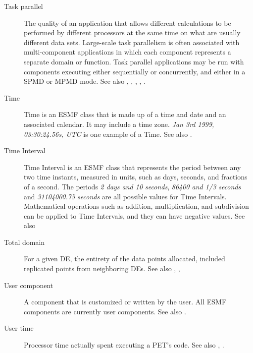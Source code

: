 \begin{description}
\label{glos:TaskParallel}  
\item[Task parallel] 
  The quality of an application that allows
  different calculations to be performed by different processors at the same 
  time on what are usually different data sets.  Large-scale task parallelism 
  is often associated with multi-component applications in which each component
  represents a separate domain or function.  Task parallel applications 
  may be run with components executing either sequentially or concurrently, 
  and either in a SPMD or MPMD mode. See also 
  , 
  , , 
  , 
  .

\label{glos:TimeInstant}
\item [Time] 
  Time is an ESMF class that is made up of a time and date and an 
  associated calendar. It may include a time zone.
  \emph{Jan 3rd 1999, 03:30:24.56s, UTC} is one example of a Time.
  See also .

\label{glos:TimeInterval} 
\item [Time Interval] 
  Time Interval is an ESMF class that represents the
  period between any two time instants, measured in units, such as days, 
  seconds, and fractions of a second.  The periods \emph{2 days and 10 seconds}, 
  \emph{86400 and 1/3 seconds} and \emph{31104000.75 seconds} are all 
  possible values for Time Intervals.  
  Mathematical operations such as addition, multiplication, and subdivision 
  can be applied to Time Intervals, and they can have negative values. 
  See also 

\label{glos:TotDomain} 
\item[Total domain] 
  For a given DE, the entirety 
  of the data points allocated, included replicated points from neighboring
  DEs.  See also , 
  , 

\label{glos:UserComp} 
\item[User component] 
  A component that is customized or
  written by the user.  All ESMF components are currently user components.
  See also .

\label{glos:UserTime} 
\item[User time] 
  Processor time actually spent executing 
  a PET's code. See also , 
  .


\end{description}

